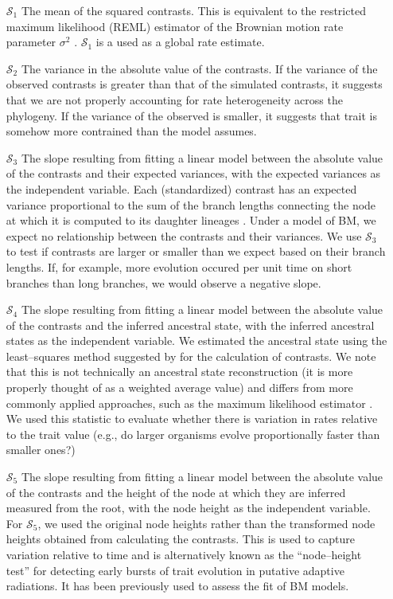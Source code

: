 \documentclass[a4paper,12pt]{article}
\begin{document}
\begin{enumerate}
\item[$\mathcal{S}_1$] The mean of the squared contrasts. This is equivalent to the restricted maximum likelihood (REML) estimator of the Brownian motion rate parameter $\sigma^2$ \citep{Garland1992, Rohlf2001}. $\mathcal{S}_1$ is a used as a global rate estimate.

\item[$\mathcal{S}_2$] The variance in the absolute value of the contrasts. If the variance of the observed contrasts is greater than that of the simulated contrasts, it suggests that we are not properly accounting for rate heterogeneity across the phylogeny. If the variance of the observed is smaller, it suggests that trait is somehow more contrained than the model assumes.

\item[$\mathcal{S}_3$] The slope resulting from fitting a linear model between the absolute value of the contrasts and their expected variances, with the expected variances as the independent variable. Each (standardized) contrast has an expected variance proportional to the sum of the branch lengths connecting the node at which it is computed to its daughter lineages  \citep{Felsenstein1985}. Under a model of BM, we expect no relationship between the contrasts and their variances. We use $\mathcal{S}_3$ to test if contrasts are larger or smaller than we expect based on their branch lengths. If, for example, more evolution occured per unit time on short branches than long branches, we would observe a negative slope.

\item[$\mathcal{S}_4$] The slope resulting from fitting a linear model between the absolute value of the contrasts and the inferred ancestral state, with the inferred ancestral states as the independent variable. We estimated the ancestral state using the least--squares method suggested by \citep{Felsenstein1985} for the calculation of contrasts. We note that this is not technically an ancestral state reconstruction (it is more properly thought of as a weighted average value) and differs from more commonly applied approaches, such as the  maximum likelihood estimator \citep{Schluter1997}. We used this statistic to evaluate whether there is variation in rates relative to the trait value (e.g., do larger organisms evolve proportionally faster than smaller ones?)

\item[$\mathcal{S}_5$] The slope resulting from fitting a linear model between the absolute value of the contrasts and the height of the node at which they are inferred measured from the root, with the node height as the independent variable. For $\mathcal{S}_5$, we used the original node heights rather than the transformed node heights obtained from calculating the contrasts. This is used to capture variation relative to time and is alternatively known as the ``node--height test'' \citep{FreckletonHarvey2006, SlaterPennell} for detecting early bursts of trait evolution in putative adaptive radiations. It has been  previously used to assess the fit of BM models.


\end{enumerate}
\end{document}
